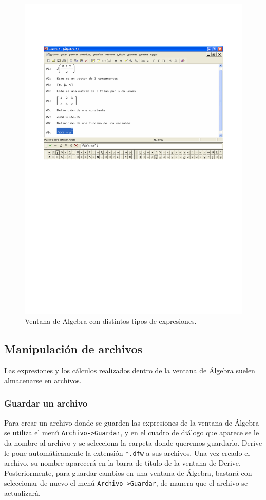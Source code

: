 \begin{figure}[h!]
\begin{center}
\includegraphics[scale=0.9]{img/introduccion_derive/expresiones}
\caption{Ventana de Algebra con distintos tipos de expresiones.}
\label{g:expresiones}
\end{center}
\end{figure}


\subsection*{Manipulación de archivos}
Las expresiones y los cálculos realizados dentro de la ventana de
Álgebra suelen almacenarse en archivos.

\subsubsection*{Guardar un archivo}
Para crear un archivo donde se guarden las expresiones de la ventana
de Álgebra se utiliza el menú \texttt{Archivo->Guardar}, y en el
cuadro de diálogo que aparece se le da nombre al archivo y se
selecciona la carpeta donde queremos guardarlo. Derive le pone
automáticamente la extensión \texttt{*.dfw} a sus archivos. Una vez
creado el archivo, su nombre aparecerá en la barra de título de la
ventana de Derive. Posteriormente, para guardar cambios en una
ventana de Álgebra, bastará con seleccionar de nuevo el menú
\texttt{Archivo->Guardar}, de manera que el archivo se actualizará.


